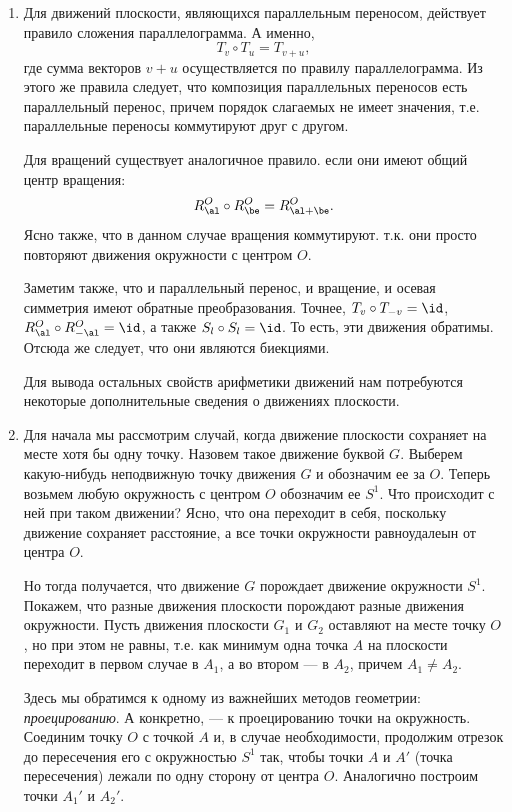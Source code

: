 \begin{enumerate}
\item Для движений плоскости, являющихся параллельным переносом, действует правило сложения параллелограмма. А именно, 
$$
T_v\circ T_u = T_{v+u},
$$
где сумма векторов $v+u$ осуществляется по правилу параллелограмма. Из этого же правила следует, что композиция параллельных переносов есть параллельный перенос, причем порядок слагаемых не имеет значения, т.е. параллельные переносы коммутируют друг с другом.

Для вращений существует аналогичное правило. если они имеют общий центр вращения:
$$
R^O_\al\circ R^O_\be = R^O_{\al+\be}.
$$
Ясно также, что в данном случае вращения коммутируют. т.к. они просто повторяют движения окружности с центром $O$.

Заметим также, что и параллельный перенос, и вращение, и осевая симметрия имеют обратные преобразования. Точнее, $T_v\circ T_{-v}=\id$, $R^O_\al\circ R^O_{-\al}=\id$, а также $S_l\circ S_l=\id$. То есть, эти движения обратимы. Отсюда же следует, что они являются биекциями.

Для вывода остальных свойств арифметики движений нам потребуются некоторые дополнительные сведения о движениях плоскости.

\item Для начала мы рассмотрим случай, когда движение плоскости сохраняет на месте хотя бы одну точку. Назовем такое движение буквой $G$. Выберем какую-нибудь неподвижную точку  движения $G$ и обозначим ее за $O$. Теперь возьмем любую окружность с центром $O$  обозначим ее $S^1$. Что происходит с ней при таком движении? Ясно, что она переходит в себя, поскольку движение сохраняет расстояние, а все точки окружности равноудалеын от центра $O$.

Но тогда получается, что движение $G$ порождает движение окружности $S^1$. Покажем, что разные движения плоскости порождают разные движения окружности. Пусть движения плоскости $G_1$ и $G_2$ оставляют на месте точку $O$, но при этом не равны, т.е. как минимум одна точка $A$ на плоскости переходит в первом случае в $A_1$, а во втором --- в $A_2$, причем $A_1\ne A_2$.

Здесь мы обратимся к одному из важнейших методов геометрии: \textit{проецированию}. А конкретно, --- к проецированию точки на окружность. Соединим точку $O$ с точкой $A$ и, в случае необходимости, продолжим отрезок до пересечения его с окружностью $S^1$ так, чтобы точки $A$ и $A'$ (точка пересечения) лежали по одну сторону от центра $O$. Аналогично построим точки $A_1'$ и $A_2'$.


\end{enumerate}
